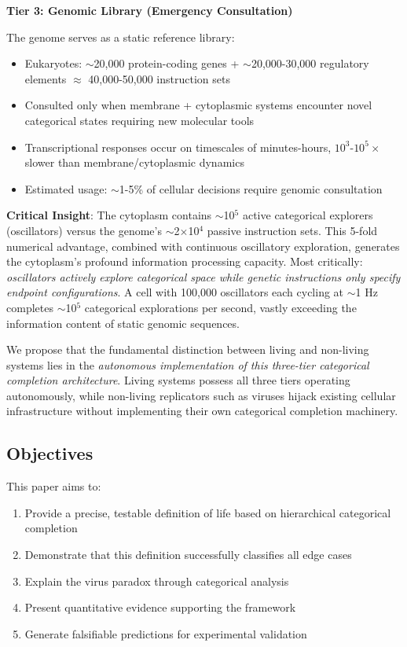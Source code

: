 \documentclass[11pt]{article}
\begin{document}
\textbf{Tier 3: Genomic Library (Emergency Consultation)}

The genome serves as a static reference library:
\begin{itemize}
\item Eukaryotes: $\sim$20,000 protein-coding genes + $\sim$20,000-30,000 regulatory elements $\approx$ 40,000-50,000 instruction sets
\item Consulted only when membrane + cytoplasmic systems encounter novel categorical states requiring new molecular tools
\item Transcriptional responses occur on timescales of minutes-hours, $10^3$-$10^5\times$ slower than membrane/cytoplasmic dynamics
\item Estimated usage: $\sim$1-5\% of cellular decisions require genomic consultation
\end{itemize}

\textbf{Critical Insight}: The cytoplasm contains $\sim$10$^5$ active categorical explorers (oscillators) versus the genome's $\sim$2$\times$10$^4$ passive instruction sets. This 5-fold numerical advantage, combined with continuous oscillatory exploration, generates the cytoplasm's profound information processing capacity. Most critically: \textit{oscillators actively explore categorical space while genetic instructions only specify endpoint configurations}. A cell with 100,000 oscillators each cycling at $\sim$1 Hz completes $\sim$10$^5$ categorical explorations per second, vastly exceeding the information content of static genomic sequences.

We propose that the fundamental distinction between living and non-living systems lies in the \textit{autonomous implementation of this three-tier categorical completion architecture}. Living systems possess all three tiers operating autonomously, while non-living replicators such as viruses hijack existing cellular infrastructure without implementing their own categorical completion machinery.

\subsection{Objectives}

This paper aims to:
\begin{enumerate}
\item Provide a precise, testable definition of life based on hierarchical categorical completion
\item Demonstrate that this definition successfully classifies all edge cases
\item Explain the virus paradox through categorical analysis
\item Present quantitative evidence supporting the framework
\item Generate falsifiable predictions for experimental validation
\end{enumerate}
\end{document}
